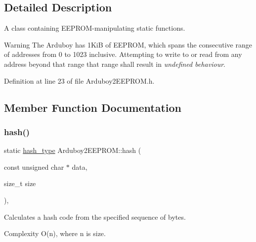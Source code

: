 \subsection{Detailed Description}
A {\ttfamily class} containing E\+E\+P\+R\+O\+M-\/manipulating {\ttfamily static} functions. 

\begin{DoxyWarning}{Warning}
The Arduboy has 1KiB of E\+E\+P\+R\+OM, which spans the consecutive range of addresses from 0 to 1023 inclusive. Attempting to write to or read from any address beyond that range that range shall result in {\itshape undefined behaviour}. 
\end{DoxyWarning}


Definition at line 23 of file Arduboy2\+E\+E\+P\+R\+O\+M.\+h.



\subsection{Member Function Documentation}
\mbox{\label{classArduboy2EEPROM_a0d81ac363020a75a0b56af7eb014f5b4}} 
\subsubsection{\texorpdfstring{hash()}{hash()}\hspace{0.1cm}{\footnotesize\ttfamily [1/2]}}
{\footnotesize\ttfamily static \mbox{\hyperlink{classArduboy2EEPROM_a6221853153af216c0d6087f1e1455cd7}{hash\+\_\+type}} Arduboy2\+E\+E\+P\+R\+O\+M\+::hash (\begin{DoxyParamCaption}\item[{const unsigned char $\ast$}]{data,  }\item[{size\+\_\+t}]{size }\end{DoxyParamCaption})\hspace{0.3cm}{\ttfamily [inline]}, {\ttfamily [static]}}



Calculates a hash code from the specified sequence of bytes. 

\begin{DoxyParagraph}{Complexity}
{\ttfamily O(n)}, where {\ttfamily n} is {\ttfamily size}.
\end{DoxyParagraph}

